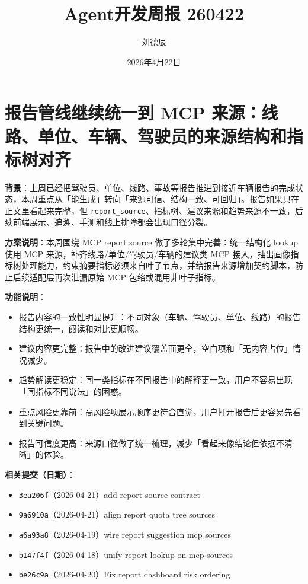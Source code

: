 \documentclass[UTF8]{ctexart}
\title{Agent开发周报 260422}
\author{刘德辰}
\date{2026年4月22日}
\begin{document}
\maketitle

\section{报告管线继续统一到 MCP 来源：线路、单位、车辆、驾驶员的来源结构和指标树对齐}

\textbf{背景}：上周已经把驾驶员、单位、线路、事故等报告推进到接近车辆报告的完成状态，本周重点从「能生成」转向「来源可信、结构一致、可回归」。报告如果只在正文里看起来完整，但 \texttt{report\_source}、指标树、建议来源和趋势来源不一致，后续前端展示、追溯、手测和线上排障都会出现口径分裂。

\textbf{方案说明}：本周围绕 MCP report source 做了多轮集中完善：统一结构化 lookup 使用 MCP 来源，补齐线路/单位/驾驶员/车辆的建议类 MCP 接入，抽出画像指标树处理能力，约束摘要指标必须来自叶子节点，并给报告来源增加契约脚本，防止后续适配层再次泄漏原始 MCP 包络或混用非叶子指标。

\textbf{功能说明}：
\begin{itemize}
\item 报告内容的一致性明显提升：不同对象（车辆、驾驶员、单位、线路）的报告结构更统一，阅读和对比更顺畅。
\item 建议内容更完整：报告中的改进建议覆盖面更全，空白项和「无内容占位」情况减少。
\item 趋势解读更稳定：同一类指标在不同报告中的解释更一致，用户不容易出现「同指标不同说法」的困惑。
\item 重点风险更靠前：高风险项展示顺序更符合直觉，用户打开报告后更容易先看到关键问题。
\item 报告可信度更高：来源口径做了统一梳理，减少「看起来像结论但依据不清晰」的体验。
\end{itemize}

\textbf{相关提交（日期）}：
\begin{itemize}
\item \texttt{3ea206f}（2026-04-21）add report source contract
\item \texttt{9a6910a}（2026-04-21）align report quota tree sources
\item \texttt{a6a93a8}（2026-04-19）wire report suggestion mcp sources
\item \texttt{b147f4f}（2026-04-18）unify report lookup on mcp sources
\item \texttt{be26c9a}（2026-04-20）Fix report dashboard risk ordering
\end{itemize}
\end{document}
